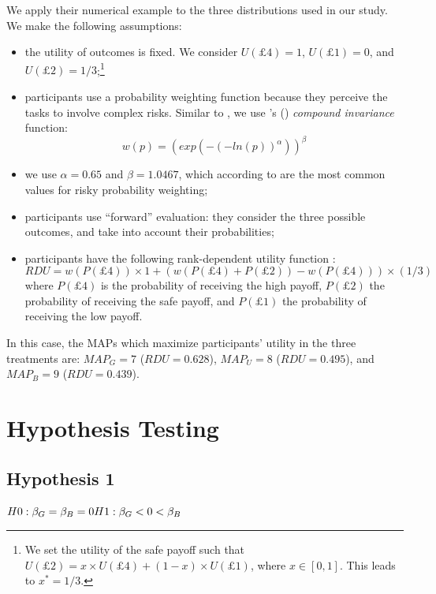 We apply their numerical example to the three distributions used in our study.
We make the following assumptions:
\begin{itemize}
\item the utility of outcomes is fixed. We consider $U(\pounds4) = 1$, $U(\pounds1) = 0$, and $U(\pounds2) = 1/3$;\footnote{
We set the utility of the safe payoff such that $U(\pounds2) = x \times U(\pounds4) + (1-x) \times U(\pounds1)$, where $x \in [0,1]$.
This leads to $x^* = 1/3$.
}
\item participants use a probability weighting function because they perceive the tasks to involve complex risks. Similar to \cite{Li2020a}, we use \citeauthor{Prelec1998}'s (\citeyear{Prelec1998}) \textit{compound invariance} function:
$$w(p) = (exp(-(-ln(p))^\alpha))^\beta$$ 
\item we use $\alpha = 0.65$ and $\beta = 1.0467$, which according to \cite{Li2020a} are the most common values for risky probability weighting;
\item participants use ``forward'' evaluation: they consider the three possible outcomes, and take into account their probabilities;
\item participants have the following rank-dependent utility function \citep{Schneider2019}:
$$RDU = w(P(\pounds4)) \times 1 + (w(P(\pounds4) + P(\pounds2)) - w(P(\pounds4))) \times (1/3)$$
where $P(\pounds4)$ is the probability of receiving the high payoff, $P(\pounds2)$ the probability of receiving the safe payoff, and $P(\pounds1)$ the probability of receiving the low payoff.
\end{itemize}

In this case, the MAPs which maximize participants' utility in the three treatments are: $MAP_G = 7$ ($RDU = 0.628$), $MAP_U = 8$ ($RDU = 0.495$), and $MAP_B = 9$ ($RDU = 0.439$).

\section{Hypothesis Testing}
\label{section:appendixb}
\setcounter{figure}{0}
\setcounter{table}{0}
\renewcommand{\thefigure}{B.\arabic{figure}}
\renewcommand{\thetable}{B.\arabic{table}}

\subsection{Hypothesis 1}
$H0: \beta_G = \beta_B = 0 \\
H1: \beta_G < 0 < \beta_B$

